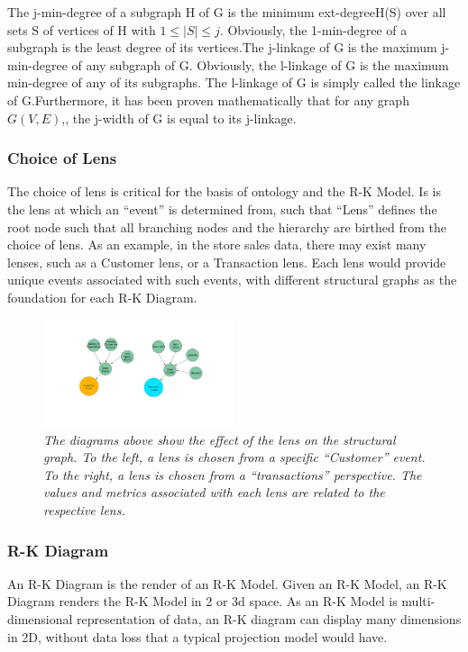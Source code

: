 The j-min-degree of a subgraph H of G is the minimum ext-degreeH(S) over all sets S of vertices of H with $1 \le |S| \le j$. Obviously, the 1-min-degree of a subgraph is the least degree of its vertices.The j-linkage of G is the maximum j-min-degree of any subgraph of G. Obviously, the l-linkage of G is the maximum min-degree of any of its subgraphs. The l-linkage of G is simply called the linkage of G.Furthermore, it has been proven mathematically that for any graph $G(V, E)$,, the j-width of G is equal to its j-linkage.

\subsubsection{Choice of Lens}
\label{sec:sectionlens}

The choice of lens is critical for the basis of ontology and the R-K Model. Is is the lens at which an ``event'' is determined from, such that ``Lens'' defines the root node such that all branching nodes and the hierarchy are birthed from the choice of lens. As an example, in the store sales data, there may exist many lenses, such as a Customer lens, or a Transaction lens. Each lens would provide unique events associated with such events, with different structural graphs as the foundation for each R-K Diagram.

\begin{figure}
	\centering
        \includegraphics[width=0.5\textwidth]{images/Lens_Choice2.jpg}
	\caption{\textit{The diagrams above show the effect of the lens on the structural graph. To the left, a lens is chosen from a specific ``Customer'' event. To the right, a lens is chosen from a ``transactions'' perspective. The values and metrics associated with each lens are related to the respective lens. }}
	\label{fig:Lens_Choice}
\end{figure}

\subsubsection{R-K Diagram}

An R-K Diagram is the render of an R-K Model. Given an R-K Model, an R-K Diagram renders the R-K Model in 2 or 3d space. As an R-K Model is multi-dimensional representation of data, an R-K diagram can display many dimensions in 2D, without data loss that a typical projection model would have.

